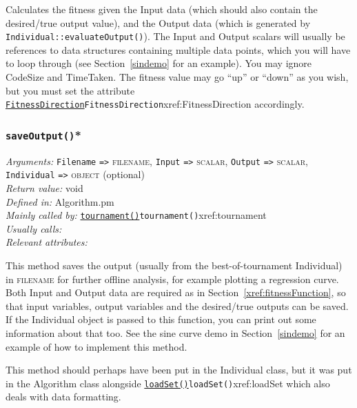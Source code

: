 \documentclass[a4paper]{article}
\begin{document}
Calculates the fitness given the Input data (which should also contain
the desired/true output value), and the Output data (which is
generated by \texttt{Individual::evaluateOutput()}).  The Input and
Output scalars will usually be references to data structures
containing multiple data points, which you will have to loop through
(see Section~\ref{sindemo} for an example).  You may ignore CodeSize
and TimeTaken.  The fitness value may go ``up'' or ``down'' as you
wish, but you must set the attribute \hyperref[no]{\texttt{FitnessDirection}}{\texttt{FitnessDirection}}{xref:FitnessDirection}
accordingly.


\subsubsection{\texttt{saveOutput()}*}\label{xref:saveOutput}
\begin{flushleft}
\textit{Arguments:} \texttt{Filename} \verb:=>: \textsc{filename}, \texttt{Input} \verb:=>: \textsc{scalar}, \texttt{Output} \verb:=>: \textsc{scalar}, \texttt{Individual} \verb:=>: \textsc{object} (optional)\\
\textit{Return value:} void\\
\textit{Defined in:} Algorithm.pm\\
\textit{Mainly called by:} \hyperref[no]{\texttt{tournament()}}{\texttt{tournament()}}{xref:tournament} \\
\textit{Usually calls:} \\
\textit{Relevant attributes:}
\end{flushleft}


This method saves the output (usually from the best-of-tournament
Individual) in \textsc{filename} for further offline analysis, for
example plotting a regression curve.  Both Input and Output data are
required as in Section~\ref{xref:fitnessFunction}, so that input variables,
output variables and the desired/true outputs can be saved.  If the
Individual object is passed to this function, you can print out some
information about that too.  See the sine curve demo in
Section~\ref{sindemo} for an example of how to implement this method.

This method should perhaps have been put in the Individual class, but
it was put in the Algorithm class alongside \hyperref[no]{\texttt{loadSet()}}{\texttt{loadSet()}}{xref:loadSet} which
also deals with data formatting.
\end{document}
